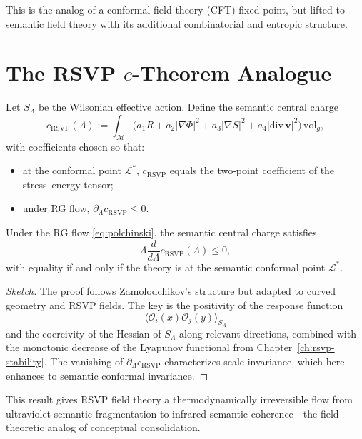 This is the analog of a conformal field theory (CFT) fixed point, but lifted to 
semantic field theory with its additional combinatorial and entropic structure.

\section{The RSVP \(c\)-Theorem Analogue}

Let $S_\Lambda$ be the Wilsonian effective action.  
Define the semantic central charge
\[
c_{\mathrm{RSVP}}(\Lambda)
:= \int_{\mathcal{M}}
   \big(
      a_1 R
    + a_2 |\nabla\Phi|^2
    + a_3 |\nabla S|^2
    + a_4 |\mathrm{div}\,\mathbf{v}|^2
   \big)\, \mathrm{vol}_g,
\]
with coefficients chosen so that:

\begin{itemize}
  \item at the conformal point $\mathcal{L}^\ast$, $c_{\mathrm{RSVP}}$ equals
        the two-point coefficient of the stress--energy tensor;
  \item under RG flow, $\partial_\Lambda c_{\mathrm{RSVP}} \le 0$.
\end{itemize}

\begin{theorem}
\label{thm:c-theorem}
Under the RG flow \eqref{eq:polchinski}, the semantic central charge satisfies
\[
\Lambda \frac{d}{d\Lambda} c_{\mathrm{RSVP}}(\Lambda) \le 0,
\]
with equality if and only if the theory is at the semantic conformal point
$\mathcal{L}^\ast$.
\end{theorem}

\begin{proof}[Sketch]
The proof follows Zamolodchikov's structure but adapted to curved geometry and
RSVP fields.  The key is the positivity of the response function
\[
\langle \mathcal{O}_i(x)\mathcal{O}_j(y)\rangle_{S_\Lambda}
\]
and the coercivity of the Hessian of $S_\Lambda$ along relevant directions,
combined with the monotonic decrease of the Lyapunov functional from
Chapter~\ref{ch:rsvp-stability}.  
The vanishing of $\partial_\Lambda c_{\mathrm{RSVP}}$ characterizes scale
invariance, which here enhances to semantic conformal invariance.
\end{proof}

This result gives RSVP field theory a thermodynamically irreversible flow from
ultraviolet semantic fragmentation to infrared semantic coherence---the field
theoretic analog of conceptual consolidation.

